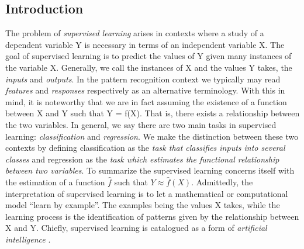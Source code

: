 \documentclass{INGUADY}
\begin{document}


\begin{body} %
\section{Introduction}
The problem of \textit{supervised learning} arises in contexts where a study of a dependent variable Y is necessary in terms of an independent variable X. The goal of supervised learning is to predict the values of Y given many instances of the variable X. Generally, we call the instances of X and the values Y takes, the \textit{inputs} and \textit{outputs}. In the pattern recognition context we typically may read \textit{features} and \textit{responses} respectively as an alternative terminology. With this in mind, it is noteworthy that we are in fact assuming the existence of a  function between X and Y such that Y = f(X). That is, there exists a relationship between the two variables. In general, we say there are two main tasks in supervised learning: \textit{classification} and \textit{regression}. We make the distinction between these two contexts by defining classification as the \textit{task that classifies inputs into several classes} and regression as the \textit{task which estimates the functional relationship between two variables}. To summarize the supervised learning concerns itself with the estimation of a function $\hat{f}$ such that $Y \approx \hat{f}(X)$. Admittedly, the interpretation of supervised learning is to let a mathematical or computational model ``learn by example''.  The examples being the values X takes, while the learning process is the identification of patterns given by the relationship between X and Y. Chiefly,  supervised learning is catalogued as a form of \textit{artificial intelligence} \cite{goodfellow2016deep}.

\end{body}
\end{document}
